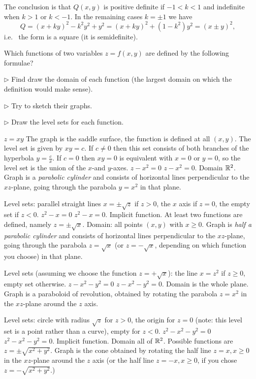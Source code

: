 \begin{multicols}{2}
The conclusion is that $Q(x,y)$ is positive definite if $-1<k<1$ and indefinite when
$k>1$ or $k<-1$.  In the remaining cases $k=\pm1$ we have
\[
  Q=(x+ky)^2 - k^2 y^2 + y^2
   =(x+ky)^2 + (1- k^2) y^2 = (x\pm y)^2,
\]
i.e.~ the form is a square (it is semidefinite).
\endanswer

\problem\label{prb:some-functions}
Which functions of two variables $z=f(x, y)$ are defined by the
following formulae?
\begin{trivlist}
\item[$\triangleright$] Find draw the domain of each function (the largest domain on
  which the definition would make sense).
\item[$\triangleright$] Try to sketch their graphs.
\item[$\triangleright$] Draw the level sets for each function.
\end{trivlist}

\subprob $z=xy$ 
\answer
The graph is the saddle surface, the function is defined at all $(x,y)$.  The level
set is given by $xy = c$.  If $c\ne 0$ then this set consists of both branches of the
hyperbola $y=\frac{c}{x}$.  If $c=0$ then $xy=0$ is equivalent with $x=0$ or $y=0$,
so the level set is the union of the $x$-and $y$-axes.
\endanswer
\subprob $z-x^2=0$ 
\answer
$z-x^2=0$.
Domain $\mathbb{R}^2$.  Graph is a \emph{parabolic cylinder} and consists of
horizontal lines perpendicular to the $xz$-plane, going through the
parabola $y=x^2$ in that plane.

Level sets: parallel straight lines $x=\pm\sqrt{z}$ if $z>0$,
the $x$ axis if $z=0$, the empty set if $z<0$.
\endanswer
\subprob $z^2-x=0$ 
\answer
$z^2-x=0$.
Implicit function.
At least two functions are defined, namely $z=\pm \sqrt{x}$.
Domain: all points $(x,y)$ with $x\ge 0$.
Graph is \emph{half a parabolic cylinder} and consists of
horizontal lines perpendicular to the $xz$-plane, going through the
parabola $z=\sqrt x$ (or $z=-\sqrt x$, depending on which function
you choose) in that plane.

Level sets (assuming we choose the function $z=+\sqrt{x}$):
the line $x=z^2$ if $z\ge0$, empty set otherwise.
\endanswer
\subprob $z-x^2-y^2=0$
\answer
$z-x^2-y^2=0$.
Domain is the whole plane.
Graph is a paraboloid of revolution, obtained by rotating the
parabola $z=x^2$ in the $xz$-plane around the $z$ axis.

Level sets: circle with radius $\sqrt{z}$ for $z>0$,
the origin for $z=0$ (note: this level set is a point rather than a curve),
empty for $z<0$.
\endanswer
\subprob $z^2-x^2-y^2=0$
\answer
$z^2-x^2-y^2=0$.
Implicit function.  Domain all of $\mathbb{R}^2$.
Possible functions are $z=\pm\sqrt{x^2+y^2}$.
Graph is the cone obtained by rotating the
half line $z=x, x\geq0$ in the $xz$-plane around the $z$ axis
(or the half line $z=-x, x\geq0$, if you chose $z=-\sqrt{x^2+y^2}$.)


\end{multicols}
